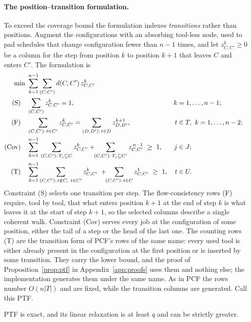 \paragraph{The position--transition formulation.}
To exceed the coverage bound the formulation indexes \emph{transitions} rather than
positions. Augment the configurations with an absorbing tool-less node, used to pad
schedules that change configuration fewer than $n-1$ times, and let
$z_{C,C'}^{k}\ge0$ be a column for the step from position $k$ to position $k+1$ that
leaves $C$ and enters $C'$. The formulation is
\[
\begin{aligned}
  \min\ & \sum_{k=1}^{n-1}\sum_{(C,C')} d(C,C')\,z_{C,C'}^{k}\\
  \text{(S)}\quad & \sum_{(C,C')} z_{C,C'}^{k}=1, & k&=1,\dots,n-1;\\
  \text{(F)}\quad & \sum_{(C,C'):\,t\in C'} z_{C,C'}^{k}
                    =\sum_{(D,D'):\,t\in D} z_{D,D'}^{k+1}, & t&\in T,\ k=1,\dots,n-2;\\
  \text{(Cov)}\quad & \sum_{k=1}^{n-1}\,\sum_{(C,C'):\,T_j\subseteq C} z_{C,C'}^{k}
                    +\!\!\sum_{(C,C'):\,T_j\subseteq C'} z_{C,C'}^{\,n-1}\ \ge\ 1,
                    & j&\in J;\\
  \text{(T)}\quad & \sum_{k=1}^{n-1}\sum_{(C,C'):\,t\notin C,\ t\in C'} z_{C,C'}^{k}
                    \;+\!\!\sum_{(C,C'):\,t\in C} z_{C,C'}^{1}\ \ge\ 1,
                    & t&\in U.
\end{aligned}
\]
Constraint (S) selects one transition per step. The flow-consistency rows (F) require,
tool by tool, that what enters position $k+1$ at the end of step $k$ is what leaves it
at the start of step $k+1$, so the selected columns describe a single coherent walk.
Constraint (Cov) serves every job at the configuration of some position, either the
tail of a step or the head of the last one. The counting rows (T) are the transition
form of PCF's rows of the same name: every used tool is either already present in the
configuration at the first position or is inserted by some transition. They carry the
lower bound, and the proof of Proposition~\ref{prop:ptf} in
Appendix~\ref{app:proofs} uses them and nothing else; the implementation generates
them under the same name. As in PCF the rows number $O(n\lvert T\rvert)$ and are
fixed, while the transition columns are generated. Call this PTF.

\begin{proposition}\label{prop:ptf}
PTF is exact, and its linear relaxation is at least $q$ and can be strictly greater.
\end{proposition}

